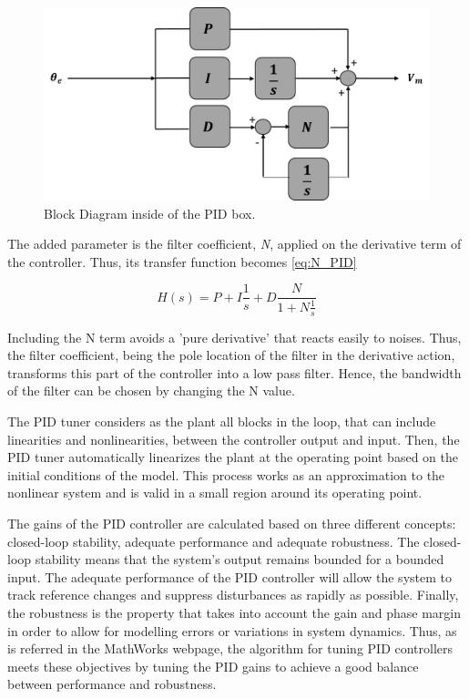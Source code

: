 \begin{figure}[H]
\centering
\includegraphics[scale=0.6]{figures/controller_box.png}
\caption{Block Diagram inside of the PID box.}
\label{PID_box_N}
\end{figure}

The added parameter is the filter coefficient, \textit{N}, applied on the derivative term of the controller. Thus, its transfer function becomes \ref{eq:N_PID}

\begin{equation}\label{eq:N_PID}
H(s) = P + I\frac{1}{s} + D\frac{N}{1+N\frac{1}{s}}
\end{equation}

Including the N term avoids a 'pure derivative' that reacts easily to noises. Thus, the filter coefficient, being the pole location of the filter in the derivative action, transforms this part of the controller into a low pass filter. Hence, the bandwidth of the filter can be chosen by changing the N value.\par

\vspace{5mm}


The PID tuner considers as the plant all blocks in the loop, that can include linearities and nonlinearities, between the controller output and input. Then, the PID tuner automatically linearizes the plant at the operating point based on the initial conditions of the model. This process works as an approximation to the nonlinear system and is valid in a small region around its operating point.\par

The gains of the PID controller are calculated based on three different concepts: closed-loop stability, adequate performance and adequate robustness. The closed-loop stability means that the system’s output remains bounded for a bounded input. The adequate performance of the PID controller will allow the system to track reference changes and suppress disturbances as rapidly as possible. Finally, the robustness is the property that takes into account the gain and phase margin in order to allow for modelling errors or variations in system dynamics. Thus, as is referred in the MathWorks webpage, the algorithm for tuning PID controllers meets these objectives by tuning the PID gains to achieve a good balance between performance and robustness.



